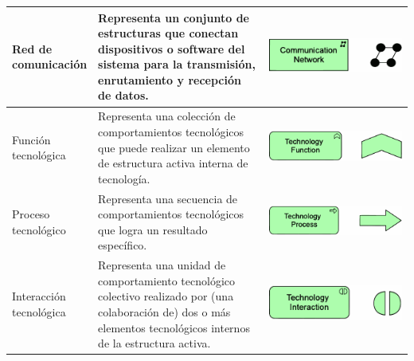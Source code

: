 \begin{longtable}{|p{0.15\linewidth}|p{0.45\linewidth}|p{0.4\linewidth} |}
    Red de comunicación
    &
    Representa un conjunto de estructuras que 
    conectan dispositivos o software del sistema 
    para la transmisión, enrutamiento y recepción 
    de datos.
    &
\begin{center}
    \includegraphics[width=0.8\linewidth]{imgs/capa_tecnologia/Communication network.pdf}
\end{center} 
    \\ \hline

    Función tecnológica
    &
    Representa una colección de comportamientos 
        tecnológicos que puede realizar un elemento de 
        estructura activa interna de tecnología.
    &
\begin{center}
    \includegraphics[width=0.8\linewidth]{imgs/capa_tecnologia/Technology function.pdf}
\end{center} 
    \\ \hline

    Proceso tecnológico
    &
    Representa una secuencia de comportamientos 
    tecnológicos que logra un resultado específico.
    &
\begin{center}
    \includegraphics[width=0.8\linewidth]{imgs/capa_tecnologia/Technology process.pdf}
\end{center} 
    \\ \hline

    Interacción 
    tecnológica
    &
    Representa una unidad de comportamiento 
        tecnológico colectivo realizado por (una 
        colaboración de) dos o más elementos 
        tecnológicos internos de la estructura activa.
    &
\begin{center}
    \includegraphics[width=0.8\linewidth]{imgs/capa_tecnologia/Technology interaction.pdf}
\end{center} 
    \\ \hline


\end{longtable}
